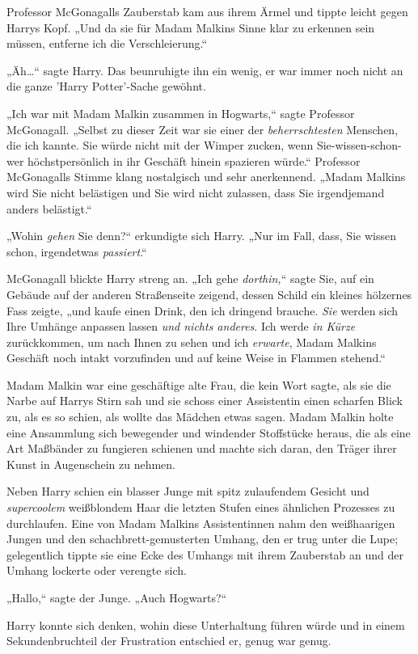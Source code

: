 {Professor McGonagalls Zauberstab kam aus ihrem Ärmel und tippte leicht gegen Harrys Kopf. „Und da sie für Madam Malkins Sinne klar zu erkennen sein müssen, entferne ich die Verschleierung.“

„Äh…“ sagte Harry. Das beunruhigte ihn ein wenig, er war immer noch nicht an die ganze 'Harry Potter'-Sache gewöhnt.

„Ich war mit Madam Malkin zusammen in Hogwarts,“ sagte Professor McGonagall. „Selbst zu dieser Zeit war sie einer der \emph{beherrschtesten} Menschen, die ich kannte. Sie würde nicht mit der Wimper zucken, wenn Sie-wissen-schon-wer höchstpersönlich in ihr Geschäft hinein spazieren würde.“ Professor McGonagalls Stimme klang nostalgisch und sehr anerkennend. „Madam Malkins wird Sie nicht belästigen und Sie wird nicht zulassen, dass Sie irgendjemand anders belästigt.“

„Wohin \emph{gehen} Sie denn?“ erkundigte sich Harry. „Nur im Fall, dass, Sie wissen schon, irgendetwas \emph{passiert}.“

McGonagall blickte Harry streng an. „Ich gehe \emph{dorthin,}“ sagte Sie, auf ein Gebäude auf der anderen Straßenseite zeigend, dessen Schild ein kleines hölzernes Fass zeigte, „und kaufe einen Drink, den ich dringend brauche. \emph{Sie} werden sich Ihre Umhänge anpassen lassen \emph{und nichts anderes}. Ich werde \emph{in Kürze} zurückkommen, um nach Ihnen zu sehen und ich \emph{erwarte}, Madam Malkins Geschäft noch intakt vorzufinden und auf keine Weise in Flammen stehend.“

Madam Malkin war eine geschäftige alte Frau, die kein Wort sagte, als sie die Narbe auf Harrys Stirn sah und sie schoss einer Assistentin einen scharfen Blick zu, als es so schien, als wollte das Mädchen etwas sagen. Madam Malkin holte eine Ansammlung sich bewegender und windender Stoffstücke heraus, die als eine Art Maßbänder zu fungieren schienen und machte sich daran, den Träger ihrer Kunst in Augenschein zu nehmen.

Neben Harry schien ein blasser Junge mit spitz zulaufendem Gesicht und \emph{supercoolem} weißblondem Haar die letzten Stufen eines ähnlichen Prozesses zu durchlaufen. Eine von Madam Malkins Assistentinnen nahm den weißhaarigen Jungen und den schachbrett-gemusterten Umhang, den er trug unter die Lupe; gelegentlich tippte sie eine Ecke des Umhangs mit ihrem Zauberstab an und der Umhang lockerte oder verengte sich.

„Hallo,“ sagte der Junge. „Auch Hogwarts?“

Harry konnte sich denken, wohin diese Unterhaltung führen würde und in einem Sekundenbruchteil der Frustration entschied er, genug war genug.

}
